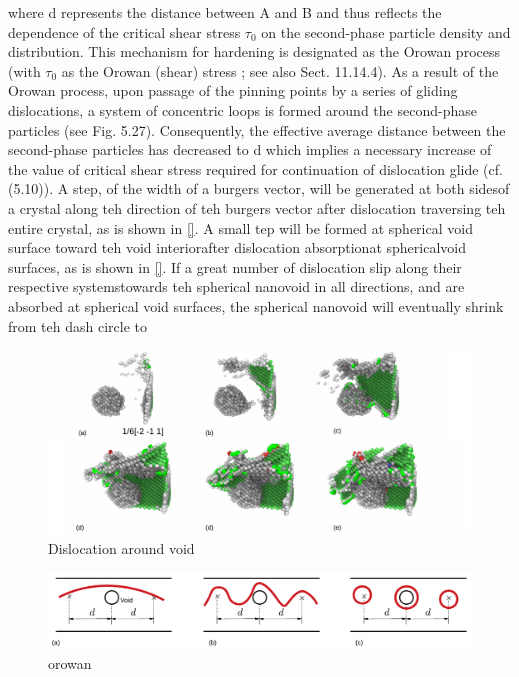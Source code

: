 \documentclass[journal,article,submit,moreauthors,pdftex,10pt,a4paper]{Definitions/mdpi}
\begin{document}
where d represents the distance between A and B and thus reflects the dependence of the critical shear stress $\tau_0$ on the second-phase particle density and distribution. This mechanism for hardening is designated as the Orowan process (with $\tau_0$ as the Orowan
(shear) stress ; see also Sect. 11.14.4). As a result of the Orowan process, upon passage of the pinning points by a series of gliding dislocations, a system of concentric loops is formed around the second-phase particles (see Fig. 5.27). Consequently, the effective average distance between the second-phase particles has decreased to d which implies a necessary increase of the value of critical shear stress required for continuation of dislocation glide (cf. (5.10)).
A step, of the width of a burgers vector, will be generated at both sidesof a crystal along teh direction of teh burgers vector after dislocation traversing teh entire crystal, as is shown in \ref{}. A small tep will be formed at spherical void surface toward teh void interiorafter dislocation absorptionat sphericalvoid surfaces, as is shown in \ref{}. If a great number of dislocation slip along their respective systemstowards teh spherical nanovoid in all directions, and are absorbed at spherical void surfaces, the spherical nanovoid will eventually shrink from teh dash circle to

\begin{figure}[ht]
	\centering
	\includegraphics[width=1\linewidth]{"img/dis-void"}
	\caption{Dislocation around void}
	\label{fig:dis-void}
\end{figure}

\begin{figure}[ht]
	\centering
	\includegraphics[width=1\linewidth]{"img/orowan"}
	\caption{orowan}
	\label{fig:dis-void}
\end{figure}
 
\end{document}
